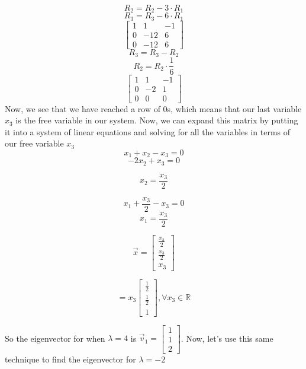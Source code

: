 \begin{enumerate}
{    $$R_2=R_2-3\cdot R_1$$
    $$R_3=R_3-6\cdot R_1$$
    $$
    \begin{bmatrix} 1 & 1 & -1\\ 
	               0 & -12 & 6\\
	               0 & -12 & 6
	\end{bmatrix}
	$$
	$$R_3=R_3-R_2$$
    $$R_2=R_2\cdot \frac{1}{6}$$
    $$
    \begin{bmatrix} 1 & 1 & -1\\ 
	               0 & -2 & 1\\
	               0 & 0 & 0
	\end{bmatrix}
	$$
	Now, we see that we have reached a row of 0s, which means that our last variable $x_3$ is the free variable in our system. Now, we can expand this matrix by putting it into a system of linear equations and solving for all the variables in terms of our free variable $x_3$
	$$x_1 +x_2 - x_3 = 0$$
	$$-2x_2 + x_3 = 0$$
	
	$$x_2 = \frac{x_3}{2}$$
	
	$$x_1 + \frac{x_3}{2} - x_3 = 0$$
	$$x_1 = \frac{x_3}{2}$$
	
	
	$$
    \vec{x} = \begin{bmatrix} \frac{x_3}{2} \\ \frac{x_3}{2} \\ x_3
    \end{bmatrix}
    $$
    
    $$
    = x_3 \begin{bmatrix} \frac{1}{2} \\ \frac{1}{2} \\ 1
    \end{bmatrix}, \forall x_3 \in \mathbb{R}
    $$
    
    So the eigenvector for when $\lambda = 4$ is $\vec{v}_1 =\begin{bmatrix} 1 \\ 1 \\ 2
    \end{bmatrix}$. Now, let's use this same technique to find the eigenvector for $\lambda = -2$

}


\end{enumerate}
